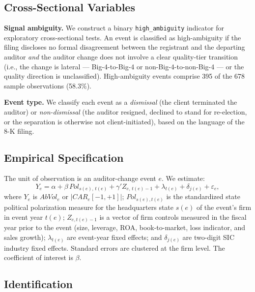 \documentclass[12pt]{article}
\begin{document}
\subsection{Cross-Sectional Variables}

\textbf{Signal ambiguity.} We construct a binary \texttt{high\_ambiguity}
indicator for exploratory cross-sectional tests. An event is classified as high-ambiguity if the
filing discloses no formal disagreement between the registrant and the
departing auditor \emph{and} the auditor change does not involve a clear
quality-tier transition (i.e., the change is lateral --- Big-4-to-Big-4 or
non-Big-4-to-non-Big-4 --- or the quality direction is unclassified).
High-ambiguity events comprise 395 of the 678 sample observations (58.3\%).

\textbf{Event type.} We classify each event as a \emph{dismissal} (the client
terminated the auditor) or \emph{non-dismissal} (the auditor resigned, declined
to stand for re-election, or the separation is otherwise not client-initiated),
based on the language of the 8-K filing.

\subsection{Empirical Specification}

The unit of observation is an auditor-change event $e$. We estimate:
\begin{equation}
    \label{eq:main}
    Y_e = \alpha + \beta\,\textit{Pol}_{s(e),\,t(e)}
    + \gamma' Z_{e,\,t(e)-1}
    + \lambda_{t(e)} + \delta_{j(e)} + \varepsilon_e,
\end{equation}
where $Y_e$ is $AbVol_e$ or $|CAR_e[-1,+1]|$; $\textit{Pol}_{s(e),t(e)}$ is the
standardized state political polarization measure for the headquarters state
$s(e)$ of the event's firm in event year $t(e)$;
$Z_{e,t(e)-1}$ is a vector of firm controls measured in the fiscal year prior
to the event (size, leverage, ROA, book-to-market, loss indicator, and sales
growth); $\lambda_{t(e)}$ are event-year fixed effects; and $\delta_{j(e)}$ are
two-digit SIC industry fixed effects. Standard errors are clustered at the firm
level. The coefficient of interest is $\beta$.

\subsection{Identification}
\end{document}
